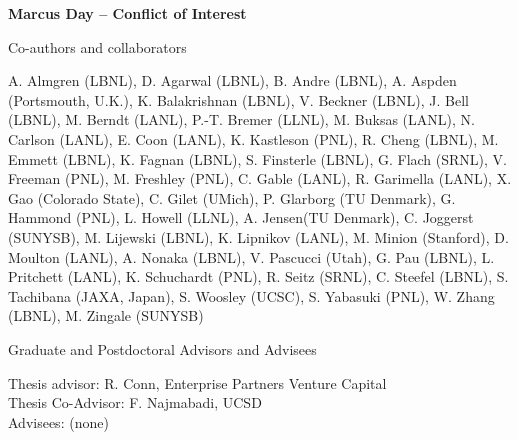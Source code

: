 \documentclass[11pt]{article}
\begin{document}
\begin{center}
{\large{\bf Marcus Day -- Conflict of Interest}} \\
\end{center}

\vspace{.2 true in}

Co-authors and collaborators

\vspace{.1in}
A. Almgren (LBNL),
D. Agarwal (LBNL),
B. Andre (LBNL),
A. Aspden (Portsmouth, U.K.),
K. Balakrishnan (LBNL),
V. Beckner (LBNL),
J. Bell (LBNL),
M. Berndt (LANL),
P.-T. Bremer (LLNL),
M. Buksas (LANL),
N. Carlson (LANL),
E. Coon (LANL),
K. Kastleson (PNL),
R. Cheng (LBNL),
M. Emmett (LBNL),
K. Fagnan (LBNL),
S. Finsterle (LBNL),
G. Flach (SRNL),
V. Freeman (PNL),
M. Freshley (PNL),
C. Gable (LANL),
R. Garimella (LANL),
X. Gao (Colorado State),
C. Gilet (UMich),
P. Glarborg (TU Denmark),
G. Hammond (PNL),
L. Howell (LLNL),
A. Jensen(TU Denmark),
C. Joggerst (SUNYSB),
M. Lijewski (LBNL),
K. Lipnikov (LANL),
M. Minion (Stanford),
D. Moulton (LANL),
A. Nonaka (LBNL),
V. Pascucci (Utah),
G. Pau (LBNL),
L. Pritchett (LANL),
K. Schuchardt (PNL),
R. Seitz (SRNL),
C. Steefel (LBNL),
S. Tachibana (JAXA, Japan),
S. Woosley (UCSC),
S. Yabasuki (PNL),
W. Zhang (LBNL),
M. Zingale (SUNYSB)


\vspace{.2 true in}
Graduate and Postdoctoral Advisors and Advisees

\vspace{.1in}
Thesis advisor:  R. Conn, Enterprise Partners Venture Capital \\
Thesis Co-Advisor: F. Najmabadi, UCSD \\
Advisees: (none)
\end{document}

